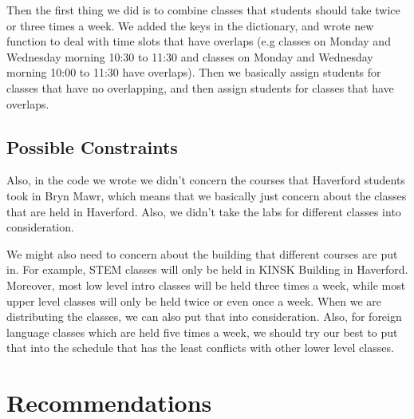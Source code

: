 \documentclass[11pt, oneside]{article}   	%
\begin{document}
Then the first thing we did is to combine classes that students should take twice or three times a week. We added the keys in the dictionary, and wrote new function to deal with time slots that have overlaps (e.g classes on Monday and Wednesday morning 10:30 to 11:30 and classes on Monday and Wednesday morning 10:00 to 11:30 have overlaps). Then we basically assign students for classes that have no overlapping, and then assign students for classes that have overlaps. 

\subsection{Possible Constraints}
Also, in the code we wrote we didn't concern the courses that Haverford students took in Bryn Mawr, which means that we basically just concern about the classes that are held in Haverford. Also, we didn't take the labs for different classes into consideration.

We might also need to concern about the building that different courses are put in. For example, STEM classes will only be held in KINSK Building in Haverford. Moreover, most low level intro classes will be held three times a week, while most upper level classes will only be held twice or even once a week. When we are distributing the classes, we can also put that into consideration. Also, for foreign language classes which are held five times a week, we should try our best to put that into the schedule that has the least conflicts with other lower level classes. 

\newpage
\section{Recommendations}
\end{document}

